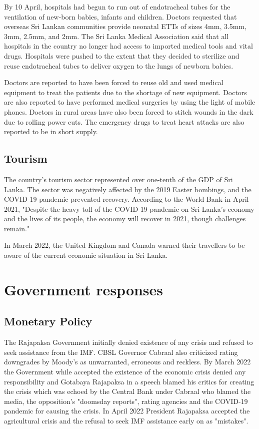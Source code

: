 \documentclass[a4paper,12pt]{article}
\begin{document}
By 10 April, hospitals had begun to run out of endotracheal tubes for the ventilation of new-born babies, infants and children. Doctors requested that overseas Sri Lankan communities provide neonatal ETTs of sizes 4mm, 3.5mm, 3mm, 2.5mm, and 2mm. The Sri Lanka Medical Association said that all hospitals in the country no longer had access to imported medical tools and vital drugs. Hospitals were pushed to the extent that they decided to sterilize and reuse endotracheal tubes to deliver oxygen to the lungs of newborn babies.

Doctors are reported to have been forced to reuse old and used medical equipment to treat the patients due to the shortage of new equipment. Doctors are also reported to have performed medical surgeries by using the light of mobile phones. Doctors in rural areas have also been forced to stitch wounds in the dark due to rolling power cuts. The emergency drugs to treat heart attacks are also reported to be in short supply.
\subsection{Tourism}
The country's tourism sector represented over one-tenth of the GDP of Sri Lanka. The sector was negatively affected by the 2019 Easter bombings, and the COVID-19 pandemic prevented recovery. According to the World Bank in April 2021, "Despite the heavy toll of the COVID-19 pandemic on Sri Lanka's economy and the lives of its people, the economy will recover in 2021, though challenges remain."

In March 2022, the United Kingdom and Canada warned their travellers to be aware of the current economic situation in Sri Lanka.

\section{Government responses}
\subsection{Monetary Policy}
The Rajapaksa Government initially denied existence of any crisis and refused to seek assistance from the IMF. CBSL Governor Cabraal also criticized rating downgrades by Moody's as unwarranted, erroneous and reckless. By March 2022 the Government while accepted the existence of the economic crisis denied any responsibility and Gotabaya Rajapaksa in a speech blamed his critics for creating the crisis which was echoed by the Central Bank under Cabraal who blamed the media, the opposition's "doomsday reports", rating agencies and the COVID-19 pandemic for causing the crisis. In April 2022 President Rajapaksa accepted the agricultural crisis and the refusal to seek IMF assistance early on as "mistakes".
\end{document}
